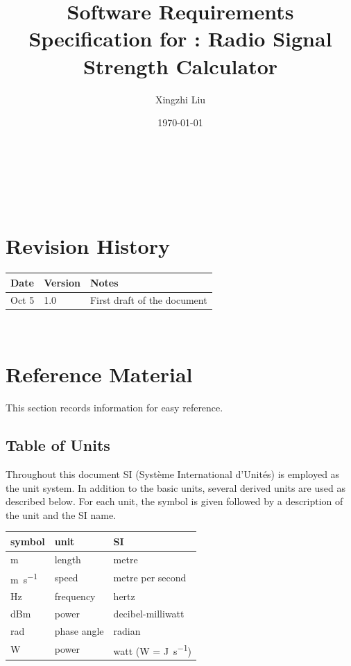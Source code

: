 \documentclass[12pt]{article}
\begin{document}
\title{Software Requirements Specification for \progname: Radio Signal Strength Calculator} 
\author{Xingzhi Liu}
\date{\today}
	
\maketitle

~\newpage


\tableofcontents

~\newpage

\section*{Revision History}

\begin{tabularx}{\textwidth}{p{3cm}p{2cm}X}
\toprule {\bf Date} & {\bf Version} & {\bf Notes}\\
\midrule
Oct 5 & 1.0 & First draft of the document\\
\bottomrule
\end{tabularx}

~\newpage

\section{Reference Material}

This section records information for easy reference.

\subsection{Table of Units}

Throughout this document SI (Syst\`{e}me International d'Unit\'{e}s) is employed
as the unit system.  In addition to the basic units, several derived units are
used as described below.  For each unit, the symbol is given followed by a
description of the unit and the SI name.
~\newline

\renewcommand{\arraystretch}{1.2}
  \noindent \begin{tabular}{l l l} 
    \toprule		
    \textbf{symbol} & \textbf{unit} & \textbf{SI}\\
    \midrule 
    \si{\metre} & length & metre\\
    \si{\metre\per\second} & speed & metre per second\\
    \si{\hertz} & frequency	& hertz\\
    \si{dBm} & power & decibel-milliwatt\\
    \si{\radian} & phase angle & radian\\
    \si{\watt} & power & watt (W = \si{\joule\per\second})\\
    \bottomrule
  \end{tabular}
\end{document}

